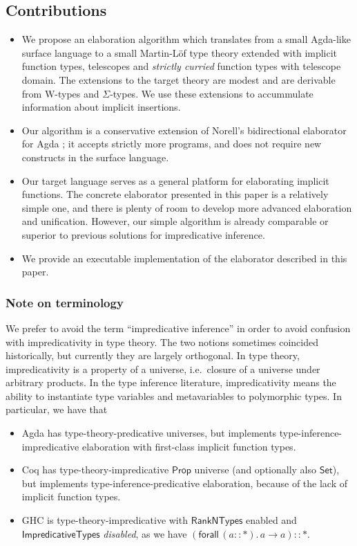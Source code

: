 \documentclass[acmsmall,review,anonymous,prologue,dvipsnames]{acmart}\settopmatter{printfolios=true,printccs=false,printacmref=false}
\newcommand{\kw}[1]{{\mathsf{#1}}}
\theoremstyle{remark}
\begin{document}
\subsection{Contributions}
\begin{itemize}
  \item We propose an elaboration algorithm which translates from a small
    Agda-like surface language to a small Martin-L\"of type theory extended with
    implicit function types, telescopes and \emph{strictly curried} function
    types with telescope domain. The extensions to the target theory are modest
    and are derivable from W-types and $\Sigma$-types. We use these extensions
    to accummulate information about implicit insertions.
  \item Our algorithm is a conservative extension of Norell's bidirectional
    elaborator for Agda \cite[Chapter~3]{norell07thesis}; it accepts strictly more
    programs, and does not require new constructs in the surface language.
  \item Our target language serves as a general platform for elaborating
    implicit functions. The concrete elaborator presented in this paper is a
    relatively simple one, and there is plenty of room to develop more advanced
    elaboration and unification. However, our simple algorithm is already
    comparable or superior to previous solutions for impredicative inference.
  \item We provide an executable implementation of the elaborator described in
    this paper.
\end{itemize}

\subsubsection{Note on terminology}

We prefer to avoid the term ``impredicative inference'' in order to avoid
confusion with impredicativity in type theory. The two notions sometimes
coincided historically, but currently they are largely orthogonal. In type
theory, impredicativity is a property of a universe, i.e.\ closure of a universe
under arbitrary products. In the type inference literature, impredicativity
means the ability to instantiate type variables and metavariables to polymorphic
types. In particular, we have that
\begin{itemize}
  \item Agda has type-theory-predicative universes, but implements
    type-inference-impredicative elaboration with first-class implicit function
    types.
  \item Coq has type-theory-impredicative $\kw{Prop}$ universe (and optionally
    also $\kw{Set}$), but implements type-inference-predicative elaboration,
    because of the lack of implicit function types.
  \item GHC is type-theory-impredicative with $\kw{RankNTypes}$ enabled and
    $\kw{ImpredicativeTypes}$ \emph{disabled}, as we have $(\kw{forall}\,(a :: *).\, a
    \to a) :: *$.
\end{itemize}
\end{document}
